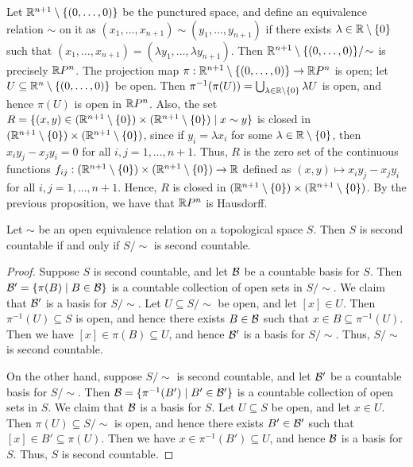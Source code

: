 \begin{example}
    Let $\mathbb{R}^{n+1} \setminus \{(0,\ldots,0)\}$ be the punctured space, and define an equivalence relation $\sim$ on it as $(x_{1},\ldots,x_{n+1}) \sim (y_{1},\ldots,y_{n+1})$ if there exists $\lambda \in \mathbb{R}\setminus\{0\}$ such that $(x_{1},\ldots,x_{n+1}) = (\lambda y_{1},\ldots,\lambda y_{n+1})$. Then $\mathbb{R}^{n+1} \setminus \{(0,\ldots,0)\}/\!\sim$ is precisely $\mathbb{R} P^{n}$. The projection map $\pi:\mathbb{R}^{n+1} \setminus \{(0,\ldots,0)\} \to \mathbb{R} P^{n}$ is open; let $U \subseteq \mathbb{R}^{n}\setminus\{(0,\ldots,0)\}$ be open. Then $\pi^{-1}(\pi(U)) = \bigcup_{\lambda \in \mathbb{R}\setminus\{0\}} \lambda U$ is open, and hence $\pi(U)$ is open in $\mathbb{R} P^{n}$. Also, the set $R = \{(x,y) \in (\mathbb{R}^{n+1}\setminus\{0\}) \times (\mathbb{R}^{n+1}\setminus\{0\}) \mid x \sim y\}$ is closed in $(\mathbb{R}^{n+1}\setminus\{0\}) \times (\mathbb{R}^{n+1}\setminus\{0\})$, since if $y_{i}=\lambda x_{i}$ for some $\lambda \in \mathbb{R}\setminus\{0\}$, then $x_{i}y_{j}-x_{j}y_{i}=0$ for all $i,j=1,\ldots,n+1$. Thus, $R$ is the zero set of the continuous functions $f_{ij}:(\mathbb{R}^{n+1}\setminus\{0\}) \times (\mathbb{R}^{n+1}\setminus\{0\}) \to \mathbb{R}$ defined as $(x,y) \mapsto x_{i}y_{j}-x_{j}y_{i}$ for all $i,j=1,\ldots,n+1$. Hence, $R$ is closed in $(\mathbb{R}^{n+1}\setminus\{0\}) \times (\mathbb{R}^{n+1}\setminus\{0\})$. By the previous proposition, we have that $\mathbb{R} P^{n}$ is Hausdorff.
\end{example}

\begin{proposition}
    Let $\sim$ be an open equivalence relation on a topological space $S$. Then $S$ is second countable if and only if $S/\!\sim$ is second countable.
\end{proposition}
\begin{proof}
    
    Suppose $S$ is second countable, and let $\mathcal{B}$ be a countable basis for $S$. Then $\mathcal{B}' = \{\pi(B) \mid B \in \mathcal{B}\}$ is a countable collection of open sets in $S/\!\sim$. We claim that $\mathcal{B}'$ is a basis for $S/\!\sim$. Let $U \subseteq S/\!\sim$ be open, and let $[x] \in U$. Then $\pi^{-1}(U) \subseteq S$ is open, and hence there exists $B \in \mathcal{B}$ such that $x \in B \subseteq \pi^{-1}(U)$. Then we have $[x] \in \pi(B) \subseteq U$, and hence $\mathcal{B}'$ is a basis for $S/\!\sim$. Thus, $S/\!\sim$ is second countable.

    On the other hand, suppose $S/\!\sim$ is second countable, and let $\mathcal{B}'$ be a countable basis for $S/\!\sim$. Then $\mathcal{B} = \{\pi^{-1}(B') \mid B' \in \mathcal{B}'\}$ is a countable collection of open sets in $S$. We claim that $\mathcal{B}$ is a basis for $S$. Let $U \subseteq S$ be open, and let $x \in U$. Then $\pi(U) \subseteq S/\!\sim$ is open, and hence there exists $B' \in \mathcal{B}'$ such that $[x] \in B' \subseteq \pi(U)$. Then we have $x \in \pi^{-1}(B') \subseteq U$, and hence $\mathcal{B}$ is a basis for $S$. Thus, $S$ is second countable.
\end{proof}

